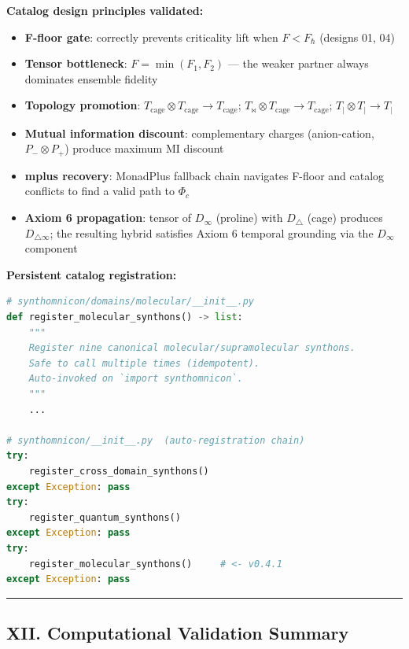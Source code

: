 \documentclass[12pt,a4paper]{article}
\begin{document}
\textbf{Catalog design principles validated:}

\begin{itemize}
    \item \textbf{F-floor gate}: correctly prevents criticality lift when $F < F_{\hbar}$ (designs 01, 04)
    \item \textbf{Tensor bottleneck}: $F = \min(F_1, F_2)$ --- the weaker partner always dominates ensemble fidelity
    \item \textbf{Topology promotion}: $T_{\text{cage}} \otimes T_{\text{cage}} \to T_{\text{cage}}$; $T_{\bowtie} \otimes T_{\text{cage}} \to T_{\text{cage}}$; $T_{|} \otimes T_{|} \to T_{|}$
    \item \textbf{Mutual information discount}: complementary charges (anion-cation, $P_{-} \otimes P_{+}$) produce maximum MI discount
    \item \textbf{mplus recovery}: MonadPlus fallback chain navigates F-floor and catalog conflicts to find a valid path to $\Phi_c$
    \item \textbf{Axiom 6 propagation}: tensor of $D_{\infty}$ (proline) with $D_{\triangle}$ (cage) produces $D_{\triangle\infty}$; the resulting hybrid satisfies Axiom 6 temporal grounding via the $D_{\infty}$ component
\end{itemize}

\textbf{Persistent catalog registration:}

\begin{lstlisting}[language=Python]
# synthomnicon/domains/molecular/__init__.py
def register_molecular_synthons() -> list:
    """
    Register nine canonical molecular/supramolecular synthons.
    Safe to call multiple times (idempotent).
    Auto-invoked on `import synthomnicon`.
    """
    ...

# synthomnicon/__init__.py  (auto-registration chain)
try:
    register_cross_domain_synthons()
except Exception: pass
try:
    register_quantum_synthons()
except Exception: pass
try:
    register_molecular_synthons()     # <- v0.4.1
except Exception: pass
\end{lstlisting}

\begin{center}
\rule{0.5\textwidth}{0.4pt}
\end{center}

\subsection{XII. Computational Validation Summary}
\end{document}
